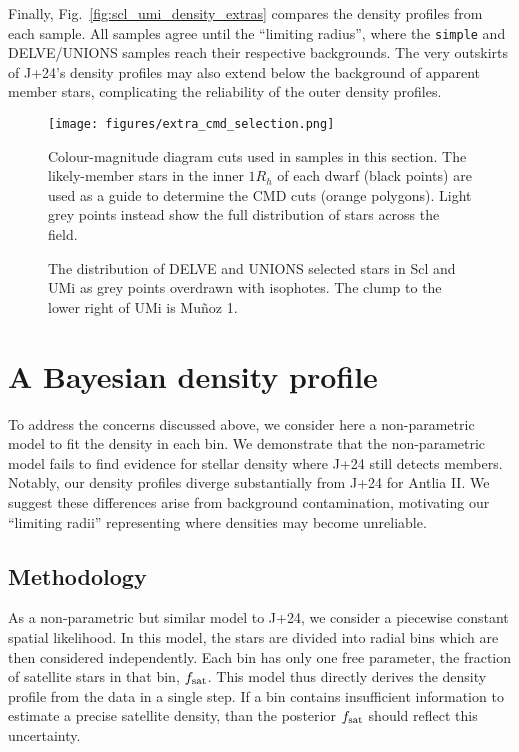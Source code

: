 Finally, Fig.~\ref{fig:scl_umi_density_extras} compares the density
profiles from each sample. All samples agree until the ``limiting
radius'', where the \texttt{simple} and DELVE/UNIONS samples reach their
respective backgrounds. The very outskirts of J+24's density profiles
may also extend below the background of apparent member stars,
complicating the reliability of the outer density profiles.

\begin{figure}
\centering
\texttt{[image: figures/extra\_cmd\_selection.png]}
\caption[Colour-Magnitude sample selection]{Colour-magnitude diagram
cuts used in samples in this section. The likely-member stars in the
inner \(1R_h\) of each dwarf (black points) are used as a guide to
determine the CMD cuts (orange polygons). Light grey points instead show
the full distribution of stars across the field.}\label{fig:extra_cmd}
\end{figure}

\begin{figure}
\centering
{}
\caption[DELVE and UNIONS spatial distribution of stars]{The
distribution of DELVE and UNIONS selected stars in Scl and UMi as grey
points overdrawn with isophotes. The clump to the lower right of UMi is
Muñoz 1.}\label{fig:delve_unions_tangent}
\end{figure}

\section{A Bayesian density profile}\label{sec:mcmc_hists}

To address the concerns discussed above, we consider here a
non-parametric model to fit the density in each bin. We demonstrate that
the non-parametric model fails to find evidence for stellar density
where J+24 still detects members. Notably, our density profiles diverge
substantially from J+24 for Antlia II. We suggest these differences
arise from background contamination, motivating our ``limiting radii''
representing where densities may become unreliable.

\subsection{Methodology}\label{methodology}

As a non-parametric but similar model to J+24, we consider a piecewise
constant spatial likelihood. In this model, the stars are divided into
radial bins which are then considered independently. Each bin has only
one free parameter, the fraction of satellite stars in that bin,
\(f_{\rm sat}\). This model thus directly derives the density profile
from the data in a single step. If a bin contains insufficient
information to estimate a precise satellite density, than the posterior
\(f_{\rm sat}\) should reflect this uncertainty.

